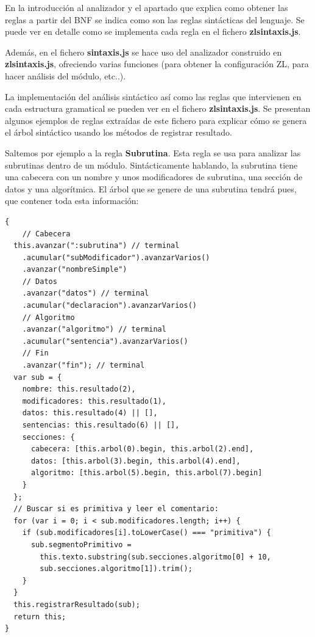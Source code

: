 \documentclass{report}
\begin{document}
	\vspace{10px}
	
	En la introducción al analizador y el apartado que explica como obtener las reglas a partir del BNF se indica como son las reglas sintácticas del lenguaje. Se puede ver en detalle como se implementa cada regla en el fichero \textbf{zlsintaxis.js}.
	
	\vspace{10px}
	
	Además, en el fichero \textbf{sintaxis.js} se hace uso del analizador construido en \textbf{zlsintaxis.js}, ofreciendo varias funciones (para obtener la configuración ZL, para hacer análisis del módulo, etc..).
	
	\vspace{10px}
	
	
	La implementación del análisis sintáctico así como las reglas que intervienen en cada estructura gramatical se pueden ver en el fichero \textbf{zlsintaxis.js}. Se presentan algunos ejemplos de reglas extraídas de este fichero para explicar cómo se genera el árbol sintáctico usando los métodos de registrar resultado.
	
	\vspace{10px}
	
	Saltemos por ejemplo a la regla \textbf{Subrutina}. Esta regla se usa para analizar las subrutinas dentro de un módulo. Sintácticamente hablando, la subrutina tiene una cabecera con un nombre y unos modificadores de subrutina, una sección de datos y una algorítmica. El árbol que se genere de una subrutina tendrá pues, que contener toda esta información:
	
\begin{BVerbatim}
{
    // Cabecera
  this.avanzar(":subrutina") // terminal
    .acumular("subModificador").avanzarVarios()
    .avanzar("nombreSimple")
    // Datos
    .avanzar("datos") // terminal
    .acumular("declaracion").avanzarVarios()
    // Algoritmo
    .avanzar("algoritmo") // terminal
    .acumular("sentencia").avanzarVarios()
    // Fin
    .avanzar("fin"); // terminal
  var sub = {
    nombre: this.resultado(2),
    modificadores: this.resultado(1),
    datos: this.resultado(4) || [],
    sentencias: this.resultado(6) || [],
    secciones: {
      cabecera: [this.arbol(0).begin, this.arbol(2).end],
      datos: [this.arbol(3).begin, this.arbol(4).end],
      algoritmo: [this.arbol(5).begin, this.arbol(7).begin]
    }
  };
  // Buscar si es primitiva y leer el comentario:
  for (var i = 0; i < sub.modificadores.length; i++) {
    if (sub.modificadores[i].toLowerCase() === "primitiva") {
      sub.segmentoPrimitivo = 
        this.texto.substring(sub.secciones.algoritmo[0] + 10, 
        sub.secciones.algoritmo[1]).trim();
    }
  }
  this.registrarResultado(sub);
  return this;
}
\end{BVerbatim}
\end{document}

